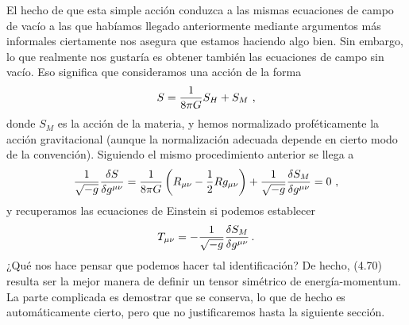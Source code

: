 \documentclass[11pt,b5paper,openany,twoside]{book}
\newcommand{\mn}{{\mu\nu}}
\def\g{{\sqrt{-g}}}
\begin{document}
El hecho de que esta simple acción conduzca a las mismas ecuaciones de campo de vacío a las que habíamos llegado anteriormente mediante argumentos más informales ciertamente nos asegura que estamos haciendo algo bien.
Sin embargo, lo que realmente nos gustaría es obtener también las ecuaciones de campo sin vacío.
Eso significa que consideramos una acción de la forma
\begin{equation}
S={{1}\over{8\pi G}}S_H+S_M\ ,\label{4.68}
\end{equation}
donde $S_M$ es la acción de la materia, y hemos normalizado proféticamente la acción gravitacional (aunque la normalización adecuada depende en cierto modo de la convención).
Siguiendo el mismo procedimiento anterior se llega a
\begin{equation}
{1\over{\g}}{{\delta S}\over{\delta g^\mn}}
={{1}\over{8\pi G}}\left(R_{\mn} -{1\over 2} Rg_\mn\right)
+{1\over{\g}} {{\delta S_M}\over{\delta g^\mn}}=0\ ,\label{4.69}
\end{equation}
y recuperamos las ecuaciones de Einstein si podemos establecer
\begin{equation}
T_\mn = -{1\over{\g}}{{\delta S_M}\over{\delta g^\mn}}\,.\label{4.70}
\end{equation}
¿Qué nos hace pensar que podemos hacer tal identificación?
De hecho, (4.70) resulta ser la mejor manera de definir un tensor simétrico de energía-momentum.
La parte complicada es demostrar que se conserva, lo que de hecho es automáticamente cierto, pero que no justificaremos hasta la siguiente sección.
\end{document}
